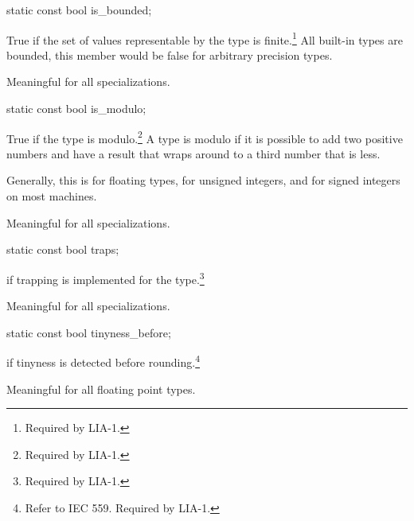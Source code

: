 \begin{itemdecl}
static const bool is_bounded;
\end{itemdecl}

\begin{itemdescr}
\pnum
True if the set of values representable by the type is finite.\footnote{Required by LIA-1.}
All built-in types are bounded, this member would be false for arbitrary
precision types.

\pnum
Meaningful for all specializations.
\end{itemdescr}

\begin{itemdecl}
static const bool is_modulo;
\end{itemdecl}

\begin{itemdescr}
\pnum
True if the type is modulo.\footnote{Required by LIA-1.}
A type is modulo if it is possible to add two positive numbers and have a
result that wraps around to a third number that is less.

\pnum
Generally, this is
for floating types,
for unsigned integers, and
for signed integers on most machines.

\pnum
Meaningful for all specializations.
\end{itemdescr}

\begin{itemdecl}
static const bool traps;
\end{itemdecl}

\begin{itemdescr}
\pnum
{}
if trapping is implemented for the type.\footnote{Required by LIA-1.}

\pnum
Meaningful for all specializations.
\end{itemdescr}

\begin{itemdecl}
static const bool tinyness_before;
\end{itemdecl}

\begin{itemdescr}
\pnum
{}
if tinyness is detected before rounding.\footnote{Refer to IEC 559.
Required by LIA-1.}

\pnum
Meaningful for all floating point types.
\end{itemdescr}

